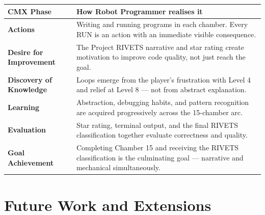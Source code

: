 \documentclass[12pt,a4paper]{article}
\begin{document}
\begin{tcolorbox}[gddbox, title={Outcome Alignment with CMX Methodology}]
\begin{tabularx}{\linewidth}{>{\bfseries\sffamily\color{primary}}p{3.8cm} X}
  \toprule
  CMX Phase & How Robot Programmer realises it \\
  \midrule
  \textbf{Actions} &
    Writing and running programs in each chamber. Every RUN is an action with an immediate visible consequence. \\
  \textbf{Desire for Improvement} &
    The Project RIVETS narrative and star rating create motivation to improve code quality, not just reach the goal. \\
  \textbf{Discovery of Knowledge} &
    Loops emerge from the player's frustration with Level 4 and relief at Level 8 --- not from abstract explanation. \\
  \textbf{Learning} &
    Abstraction, debugging habits, and pattern recognition are acquired progressively across the 15-chamber arc. \\
  \textbf{Evaluation} &
    Star rating, terminal output, and the final RIVETS classification together evaluate correctness and quality. \\
  \textbf{Goal Achievement} &
    Completing Chamber 15 and receiving the RIVETS classification is the culminating goal --- narrative and mechanical simultaneously. \\
  \bottomrule
\end{tabularx}
\end{tcolorbox}


\section{Future Work and Extensions}
\end{document}
